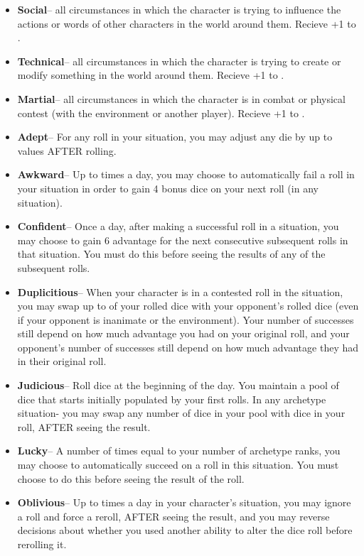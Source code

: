 \begin{GRPquicknotewide}
\begin{itemize}
	\item \textbf{Social}-- all circumstances in which the character is trying to influence the actions or words of other characters in the world around them. Recieve +1 to . 
	\item \textbf{Technical}-- all circumstances in which the character is trying to create or modify something in the world around them. Recieve +1 to . 
	\item \textbf{Martial}-- all circumstances in which the character is in combat or physical contest (with the environment or another player). Recieve +1 to .
\end{itemize}
\vspace{4\baselineskip}
\begin{itemize}
	\item \textbf{Adept}-- For any roll in your situation, you may adjust any die by up to  values AFTER rolling.
	\item \textbf{Awkward}-- Up to  times a day, you may choose to automatically fail a roll in your situation in order to gain 4 bonus dice on your next roll (in any situation).
	\item \textbf{Confident}-- Once a day, after making a successful roll in a situation, you may choose to gain 6 advantage for the next  consecutive subsequent rolls in that situation. You must do this before seeing the results of any of the subsequent rolls.
	\item \textbf{Duplicitious}-- When your character is in a contested roll in the situation, you may swap up to  of your rolled dice with your opponent's rolled dice (even if your opponent is inanimate or the environment). Your number of successes still depend on how much advantage you had on your original roll, and your opponent's number of successes still depend on how much advantage they had in their original roll.
	\item \textbf{Judicious}--  Roll  dice at the beginning of the day. You maintain a pool of  dice that starts initially populated by your first rolls. In any archetype situation- you may swap any number of dice in your pool with dice in your roll, AFTER seeing the result.
	\item \textbf{Lucky}-- A number of times equal to your number of archetype ranks, you may choose to automatically succeed on a roll in this situation. You must choose to do this before seeing the result of the roll.
	\item \textbf{Oblivious}-- Up to  times a day in your character's situation, you may ignore a roll and force a reroll, AFTER seeing the result, and you may reverse decisions about whether you used another ability to alter the dice roll before rerolling it.
\end{itemize}
\end{GRPquicknotewide}

